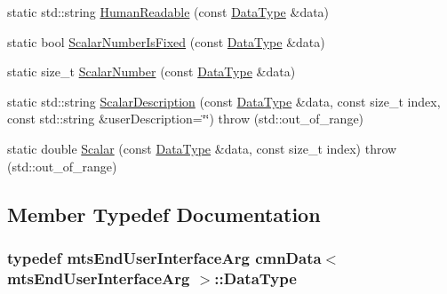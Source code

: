 \begin{DoxyCompactItemize}
\item 
static std\+::string \hyperlink{classcmn_data_3_01mts_end_user_interface_arg_01_4_ada93bf426247fab620641219c28ba712}{Human\+Readable} (const \hyperlink{classcmn_data_3_01mts_end_user_interface_arg_01_4_aedf4f6543ddf0d9a93eeb4825c17a9e8}{Data\+Type} \&data)
\item 
static bool \hyperlink{classcmn_data_3_01mts_end_user_interface_arg_01_4_a4260ef19141a6cec75d69bfa86ea948e}{Scalar\+Number\+Is\+Fixed} (const \hyperlink{classcmn_data_3_01mts_end_user_interface_arg_01_4_aedf4f6543ddf0d9a93eeb4825c17a9e8}{Data\+Type} \&data)
\item 
static size\+\_\+t \hyperlink{classcmn_data_3_01mts_end_user_interface_arg_01_4_a72a5757f60e76af71cb2af9c1fb9141e}{Scalar\+Number} (const \hyperlink{classcmn_data_3_01mts_end_user_interface_arg_01_4_aedf4f6543ddf0d9a93eeb4825c17a9e8}{Data\+Type} \&data)
\item 
static std\+::string \hyperlink{classcmn_data_3_01mts_end_user_interface_arg_01_4_a46dde16f2f0cf6ee9a2a830ccafe99b0}{Scalar\+Description} (const \hyperlink{classcmn_data_3_01mts_end_user_interface_arg_01_4_aedf4f6543ddf0d9a93eeb4825c17a9e8}{Data\+Type} \&data, const size\+\_\+t index, const std\+::string \&user\+Description=\char`\"{}\char`\"{})  throw (std\+::out\+\_\+of\+\_\+range)
\item 
static double \hyperlink{classcmn_data_3_01mts_end_user_interface_arg_01_4_a65e442158c0fcbc145eff6ad4842d1e5}{Scalar} (const \hyperlink{classcmn_data_3_01mts_end_user_interface_arg_01_4_aedf4f6543ddf0d9a93eeb4825c17a9e8}{Data\+Type} \&data, const size\+\_\+t index)  throw (std\+::out\+\_\+of\+\_\+range)
\end{DoxyCompactItemize}


\subsection{Member Typedef Documentation}
\hypertarget{classcmn_data_3_01mts_end_user_interface_arg_01_4_aedf4f6543ddf0d9a93eeb4825c17a9e8}{}
\subsubsection[{Data\+Type}]{\setlength{\rightskip}{0pt plus 5cm}typedef {\bf mts\+End\+User\+Interface\+Arg} {\bf cmn\+Data}$<$ {\bf mts\+End\+User\+Interface\+Arg} $>$\+::{\bf Data\+Type}}\label{classcmn_data_3_01mts_end_user_interface_arg_01_4_aedf4f6543ddf0d9a93eeb4825c17a9e8}


